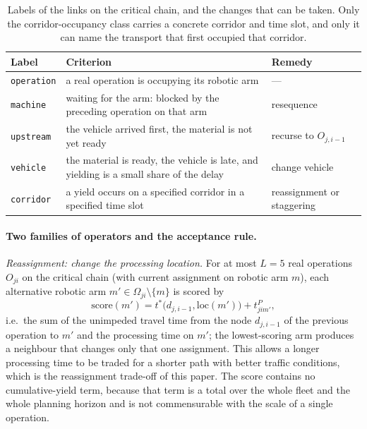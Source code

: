 \documentclass[manuscript,screen,review]{acmart}
\begin{document}
\begin{table}[t]
  \caption{Labels of the links on the critical chain, and the changes that can be taken.
  Only the corridor-occupancy class carries a concrete corridor and time slot, and only it can name the transport that first occupied that corridor.}
\label{tab:attrib}
\footnotesize
\begin{tabular}{@{}llp{2.55cm}@{}}
\toprule
Label & Criterion & Remedy \\
\midrule
\texttt{operation} & a real operation is occupying its robotic arm & --- \\
\texttt{machine} & waiting for the arm: blocked by the preceding operation on that arm
  & resequence \\
\texttt{upstream} & the vehicle arrived first, the material is not yet ready & recurse to $O_{j,i-1}$ \\
\texttt{vehicle} & the material is ready, the vehicle is late, and yielding is a small share of the delay & change vehicle \\
\texttt{corridor} & a yield occurs on a specified corridor in a specified time slot & reassignment or staggering \\
\bottomrule
\end{tabular}
\end{table}

\paragraph{Two families of operators and the acceptance rule.}
\emph{Reassignment: change the processing location.} For at most $L=5$ real operations $O_{ji}$ on the critical chain (with current assignment on robotic arm $m$), each alternative robotic arm
$m'\in\Omega_{ji}\setminus\{m\}$ is scored by
\begin{equation}
\label{eq:reassign}
\mathrm{score}(m')=t^{*}\bigl(d_{j,i-1},\mathrm{loc}(m')\bigr)
+t^{P}_{jim'},
\end{equation}
i.e.\ the sum of the unimpeded travel time from the node $d_{j,i-1}$ of the previous operation to $m'$ and the processing time on $m'$; the lowest-scoring arm produces a neighbour that changes only that one assignment. This allows a longer processing time to be traded for a shorter path with better traffic conditions, which is the reassignment trade-off of this paper.
The score contains no cumulative-yield term, because that term is a total over the whole fleet and the whole planning horizon and is not commensurable with the scale of a single operation.
\end{document}
